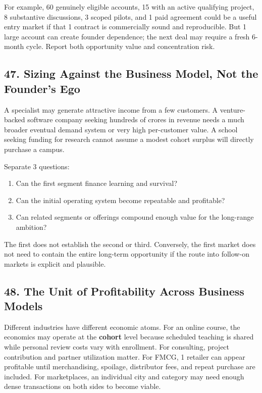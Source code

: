 For example, 60 genuinely eligible accounts, 15 with an active qualifying project, 8 substantive discussions, 3 scoped pilots, and 1 paid agreement could be a useful entry market if that 1 contract is commercially sound and reproducible. But 1 large account can create founder dependence; the next deal may require a fresh 6-month cycle. Report both opportunity value and concentration risk.

\subsection*{47. Sizing Against the Business Model, Not the Founder's Ego}

A specialist may generate attractive income from a few customers. A venture-backed software company seeking hundreds of crores in revenue needs a much broader eventual demand system or very high per-customer value. A school seeking funding for research cannot assume a modest cohort surplus will directly purchase a campus.

Separate 3 questions:

\begin{enumerate}
    \item Can the first segment finance learning and survival?
    \item Can the initial operating system become repeatable and profitable?
    \item Can related segments or offerings compound enough value for the long-range ambition?
\end{enumerate}

The first does not establish the second or third. Conversely, the first market does not need to contain the entire long-term opportunity if the route into follow-on markets is explicit and plausible.

\subsection*{48. The Unit of Profitability Across Business Models}

Different industries have different economic atoms. For an online course, the economics may operate at the \textbf{cohort} level because scheduled teaching is shared while personal review costs vary with enrollment. For consulting, project contribution and partner utilization matter. For FMCG, 1 retailer can appear profitable until merchandising, spoilage, distributor fees, and repeat purchase are included. For marketplaces, an individual city and category may need enough dense transactions on both sides to become viable.


